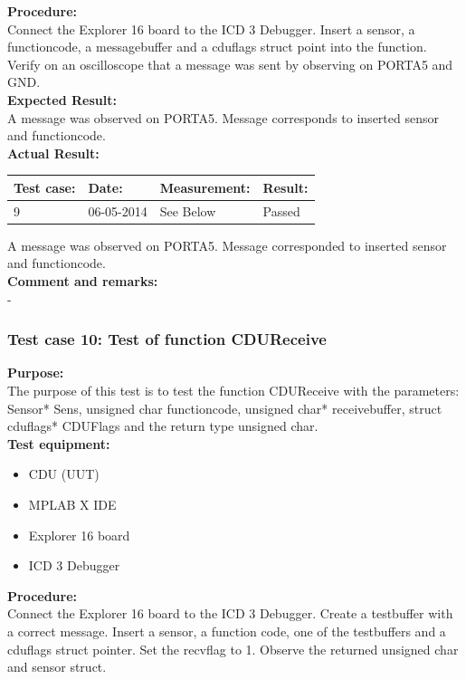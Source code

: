 \textbf{Procedure:}\\
Connect the Explorer 16 board to the ICD 3 Debugger. Insert a sensor, a functioncode, a messagebuffer and a cduflags struct point into the function. Verify on an oscilloscope that a message was sent by observing on PORTA5 and GND.\\

\textbf{Expected Result:}\\
A message was observed on PORTA5. Message corresponds to inserted sensor and functioncode.\\

\textbf{Actual Result:}\\
\begin{table}[H]
\centering
\begin{tabular}{|p{2cm}|p{2cm}|p{3cm}|p{2cm}|}\hline
\textbf{Test case:} & \textbf{Date:} & \textbf{Measurement:} & \textbf{Result:} \\ \hline
9 & 06-05-2014 & See Below & Passed \\ \hline
\end{tabular}
\end{table}
A message was observed on PORTA5. Message corresponded to inserted sensor and functioncode.\\

\textbf{Comment and remarks:}\\
-\\

\subsubsection{Test case 10: Test of function CDUReceive }
\textbf{Purpose:}\\
The purpose of this test is to test the function CDUReceive with the parameters: Sensor* Sens, unsigned char functioncode, unsigned char* receivebuffer, struct cduflags* CDUFlags and the return type unsigned char.\\

\textbf{Test equipment:}
\begin{itemize}
\item CDU (UUT)
\item MPLAB X IDE
\item Explorer 16 board
\item ICD 3 Debugger
\end{itemize}

\textbf{Procedure:}\\
Connect the Explorer 16 board to the ICD 3 Debugger. Create a testbuffer with a correct message. Insert a sensor, a function code, one of the testbuffers and a cduflags struct pointer. Set the recvflag to 1. Observe the returned unsigned char and sensor struct.\\

